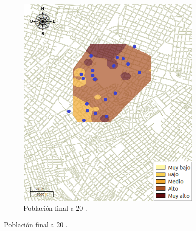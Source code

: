 \begin{figure}[!htpb]
\begin{subfigure}[b]{0.225\textwidth}
        \includegraphics[width=\textwidth]{./graphics/temp-20-final.png}
        \caption{ Población final a 20 \textcelsius.}
    \end{subfigure}


\end{figure}
